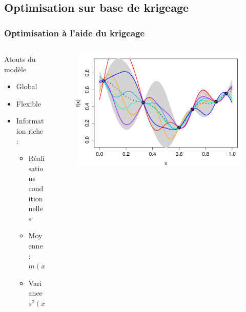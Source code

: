 \subsection{Optimisation sur base de krigeage}
\begin{frame}
\frametitle{Optimisation à l'aide du krigeage} %
\begin{columns}[t]
\begin{column}{6cm}

\begin{block}{Atouts du modèle}
 \begin{itemize}
  \item Global
  \item Flexible
  \item Information riche :
   \begin{itemize}
   \item Réalisations conditionnelles
    \item Moyenne : $m(x)$
    \item Variance $s^2(x)$
   \end{itemize}
 \end{itemize}
\end{block}
\end{column}

\begin{column}{6cm}
\begin{figure}
	\centering
	\includegraphics[trim=3mm 0 2mm 0,clip, width=\textwidth]{fig/4real.pdf}
\end{figure}	


\end{column}
\end{columns}
\end{frame}
